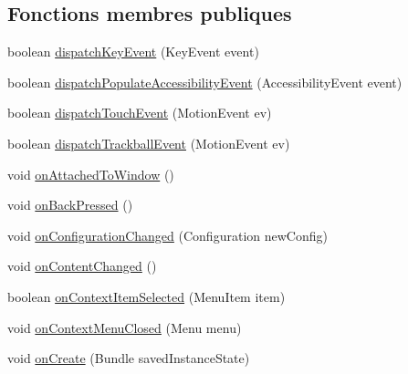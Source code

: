\subsection*{Fonctions membres publiques}
\begin{DoxyCompactItemize}
\item 
boolean \hyperlink{classorg_1_1qtproject_1_1qt5_1_1android_1_1bindings_1_1_qt_activity_a3419f10b60670ae0fd0a222fcd684273}{dispatch\-Key\-Event} (Key\-Event event)
\item 
boolean \hyperlink{classorg_1_1qtproject_1_1qt5_1_1android_1_1bindings_1_1_qt_activity_a7eacf9d228567bace814d7d90cc88dc1}{dispatch\-Populate\-Accessibility\-Event} (Accessibility\-Event event)
\item 
boolean \hyperlink{classorg_1_1qtproject_1_1qt5_1_1android_1_1bindings_1_1_qt_activity_a080d702cac33de4a97b4645567cf8c04}{dispatch\-Touch\-Event} (Motion\-Event ev)
\item 
boolean \hyperlink{classorg_1_1qtproject_1_1qt5_1_1android_1_1bindings_1_1_qt_activity_ad305b6d78907e6fc4bc4fa9b77256a22}{dispatch\-Trackball\-Event} (Motion\-Event ev)
\item 
void \hyperlink{classorg_1_1qtproject_1_1qt5_1_1android_1_1bindings_1_1_qt_activity_a052fd4aee0de52bcf2d8a10c5671d586}{on\-Attached\-To\-Window} ()
\item 
void \hyperlink{classorg_1_1qtproject_1_1qt5_1_1android_1_1bindings_1_1_qt_activity_a593eeb49762865051c6348a6b98e7ff1}{on\-Back\-Pressed} ()
\item 
void \hyperlink{classorg_1_1qtproject_1_1qt5_1_1android_1_1bindings_1_1_qt_activity_a75ef70261caa7d4db3041147dc46c5d0}{on\-Configuration\-Changed} (Configuration new\-Config)
\item 
void \hyperlink{classorg_1_1qtproject_1_1qt5_1_1android_1_1bindings_1_1_qt_activity_a6310ffd404267a66b52dd4c3b357b560}{on\-Content\-Changed} ()
\item 
boolean \hyperlink{classorg_1_1qtproject_1_1qt5_1_1android_1_1bindings_1_1_qt_activity_a67108692da62e48e5d02b22ed3d83769}{on\-Context\-Item\-Selected} (Menu\-Item item)
\item 
void \hyperlink{classorg_1_1qtproject_1_1qt5_1_1android_1_1bindings_1_1_qt_activity_a3e845800dc8fc21ff23589005d1a781c}{on\-Context\-Menu\-Closed} (Menu menu)
\item 
void \hyperlink{classorg_1_1qtproject_1_1qt5_1_1android_1_1bindings_1_1_qt_activity_aa826639406d6f0697e0f1afcf69c748c}{on\-Create} (Bundle saved\-Instance\-State)
\item 

\end{DoxyCompactItemize}
